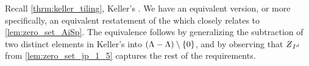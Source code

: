 \documentclass[../thesis.tex]{subfiles}
\begin{document}
  






Recall \cref{thrm:keller_tiling}, Keller's . We have an equivalent version, or more specifically, an equivalent restatement of the  which closely relates to \cref{lem:zero_set_AiSp}. The equivalence follows by generalizing the subtraction of two distinct elements in Keller's  into $(\Lambda-\Lambda)\setminus\{0\}$, and by observing that $\Zstroke_{I^d}$ from \cref{lem:zero_set_jp_1_5} captures the rest of the requirements.

\end{document}
